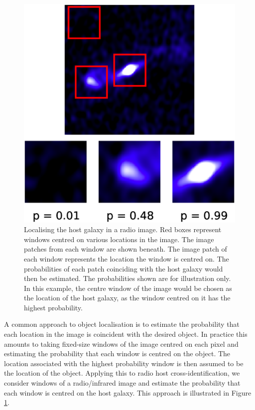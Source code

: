 \documentclass[fleqn,usenatbib,usedcolumn]{mnras}
\begin{document}
    \begin{figure}
      \centering
      \includegraphics[width=0.8\columnwidth]{images/windows.eps}
      \caption{Localising the host galaxy in a radio image. Red boxes
        represent windows centred on various locations in the image. The image
        patches from each window are shown beneath. The image patch of each
        window represents the location the window is centred on. The
        probabilities of each patch coinciding with the host galaxy would then
        be estimated. The probabilities shown are for illustration only. In
        this example, the centre window of the image would be chosen as the
        location of the host galaxy, as the window centred on it has the
        highest probability.}
      \label{fig:windows}
    \end{figure}

    A common approach to object localisation is to estimate the probability
    that each location in the image is coincident with the desired object. In
    practice this amounts to taking fixed-size windows of the image centred on
    each pixel and estimating the probability that each window is centred on
    the object. The location associated with the highest probability window is
    then assumed to be the location of the object. Applying this to radio host
    cross-identification, we consider windows of a radio/infrared image and
    estimate the probability that each window is centred on the host galaxy.
    This approach is illustrated in Figure \ref{fig:windows}.
\end{document}
